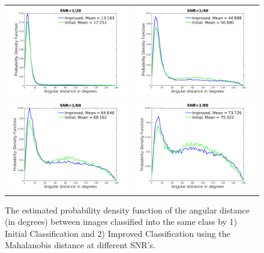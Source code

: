 \documentclass{article}
\begin{document}
\begin{figure}[!htbp]
\begin{center}
\begin{tabular}{cc}
\includegraphics[width=.49\columnwidth]{fighist_snr1by20.png} & \includegraphics[width=.49\columnwidth]{fighist_snr1by40.png} \\
\includegraphics[width=.49\columnwidth]{fighist_snr1by60.png} & \includegraphics[width=.49\columnwidth]{fighist_snr1by80.png}
\end{tabular}
\end{center}
\vspace{-.15in}
\caption{The estimated probability density function of the angular distance (in degrees) between images classified into the same class by 1) Initial Classification and 2) Improved Classification using the Mahalanobis distance at different SNR's.}
\vspace{-.15in}
\label{fig:hist}
\end{figure}
\end{document}
